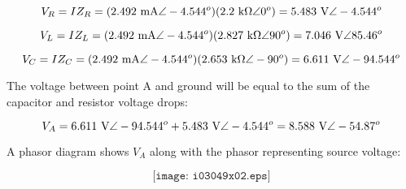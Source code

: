 $$V_R = I Z_R = (2.492 \hbox{ mA} \angle -4.544^o)(2.2 \hbox{ k}\Omega \angle 0^o) = 5.483 \hbox{ V} \angle -4.544^o$$

$$V_L = I Z_L = (2.492 \hbox{ mA} \angle -4.544^o)(2.827 \hbox{ k}\Omega \angle 90^o) = 7.046 \hbox{ V} \angle 85.46^o$$

$$V_C = I Z_C = (2.492 \hbox{ mA} \angle -4.544^o)(2.653 \hbox{ k}\Omega \angle -90^o) = 6.611 \hbox{ V} \angle -94.544^o$$

The voltage between point A and ground will be equal to the sum of the capacitor and resistor voltage drops:

$$V_A = 6.611 \hbox{ V} \angle -94.544^o + 5.483 \hbox{ V} \angle -4.544^o = 8.588 \hbox{ V} \angle -54.87^o$$

A phasor diagram shows $V_A$ along with the phasor representing source voltage:

$$\texttt{[image: i03049x02.eps]}$$




